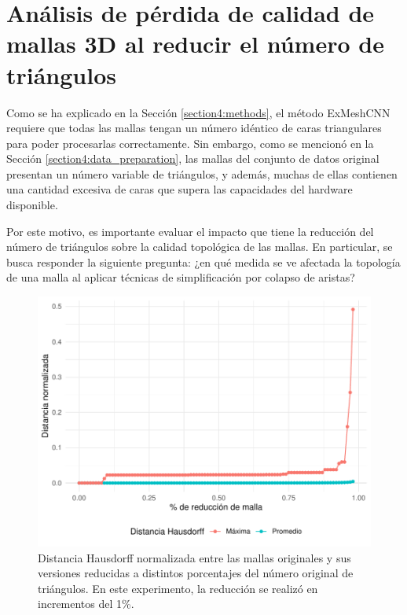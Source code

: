 \section{Análisis de pérdida de calidad de mallas 3D al reducir el número de triángulos}
\label{section5:experiment_edge_collapse}
Como se ha explicado en la Sección \ref{section4:methods}, el método ExMeshCNN requiere que todas las mallas tengan un número idéntico de caras triangulares para poder procesarlas correctamente. Sin embargo, como se mencionó en la Sección \ref{section4:data_preparation}, las mallas del conjunto de datos original presentan un número variable de triángulos, y además, muchas de ellas contienen una cantidad excesiva de caras que supera las capacidades del hardware disponible.

Por este motivo, es importante evaluar el impacto que tiene la reducción del número de triángulos sobre la calidad topológica de las mallas. En particular, se busca responder la siguiente pregunta: ¿en qué medida se ve afectada la topología de una malla al aplicar técnicas de simplificación por colapso de aristas?

\begin{figure}[h]
    \centering
    \includegraphics[width=\linewidth]{figures/5_experiments/mesh_redux_study.pdf}
    \caption[Estudio de reducción de mallas]{Distancia Hausdorff normalizada entre las mallas originales y sus versiones reducidas a distintos porcentajes del número original de triángulos. En este experimento, la reducción se realizó en incrementos del 1\%.}
    \label{fig5:redux_study}
\end{figure}

